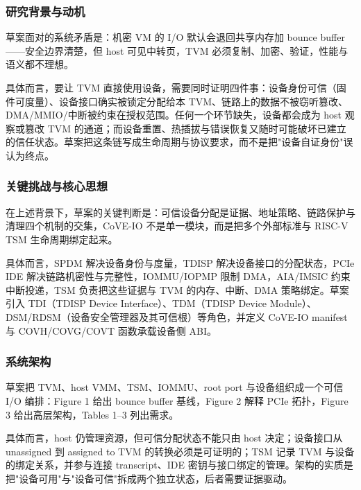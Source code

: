 \documentclass[11pt]{ctexart}
\begin{document}
\subsubsection{研究背景与动机}
草案面对的系统矛盾是：机密 VM 的 I/O 默认会退回共享内存加 bounce buffer——安全边界清楚，但 host 可见中转页，TVM 必须复制、加密、验证，性能与语义都不理想。\par
具体而言，要让 TVM 直接使用设备，需要同时证明四件事：设备身份可信（固件可度量）、设备接口确实被锁定分配给本 TVM、链路上的数据不被窃听篡改、DMA/MMIO/中断被约束在授权范围。任何一个环节缺失，设备都会成为 host 观察或篡改 TVM 的通道；而设备重置、热插拔与错误恢复又随时可能破坏已建立的信任状态。草案把这条链写成生命周期与协议要求，而不是把"设备自证身份"误认为终点。\par
\subsubsection{关键挑战与核心思想}
在上述背景下，草案的关键判断是：可信设备分配是证据、地址策略、链路保护与清理四个机制的交集，CoVE-IO 不是单一模块，而是把多个外部标准与 RISC-V TSM 生命周期绑定起来。\par
具体而言，SPDM 解决设备身份与度量，TDISP 解决设备接口的分配状态，PCIe IDE 解决链路机密性与完整性，IOMMU/IOPMP 限制 DMA，AIA/IMSIC 约束中断投递，TSM 负责把这些证据与 TVM 的内存、中断、DMA 策略绑定。草案引入 TDI（TDISP Device Interface）、TDM（TDISP Device Module）、DSM/RDSM（设备安全管理器及其可信根）等角色，并定义 CoVE-IO manifest 与 COVH/COVG/COVT 函数承载设备侧 ABI。\par
\subsubsection{系统架构}
草案把 TVM、host VMM、TSM、IOMMU、root port 与设备组织成一个可信 I/O 编排：Figure 1 给出 bounce buffer 基线，Figure 2 解释 PCIe 拓扑，Figure 3 给出高层架构，Tables 1--3 列出需求。\par
具体而言，host 仍管理资源，但可信分配状态不能只由 host 决定；设备接口从 unassigned 到 assigned to TVM 的转换必须是可证明的；TSM 记录 TVM 与设备的绑定关系，并参与连接 transcript、IDE 密钥与接口绑定的管理。架构的实质是把"设备可用"与"设备可信"拆成两个独立状态，后者需要证据驱动。\par
\end{document}
